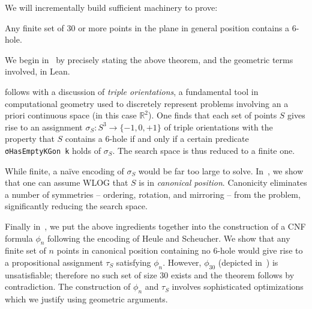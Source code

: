 We will incrementally build sufficient machinery to prove:

\begin{theorem*}
Any finite set of $30$ or more points in the plane in general position contains a $6$-hole.
\end{theorem*}

We begin in~ by precisely stating the above theorem,
and the geometric terms involved, in Lean.

 follows with a discussion of \emph{triple orientations},
a fundamental tool in computational geometry
used to discretely represent problems
involving an a priori continuous space (in this case $\mathbb{R}^2$).
One finds that each set of points $S$ gives rise to an assignment $\sigma_S: S^3 \to \{-1,0,+1\}$
of triple orientations
with the property that $S$ contains a $6$-hole
if and only if a certain predicate \lstinline|σHasEmptyKGon k| holds of $\sigma_S$.
The search space is thus reduced to a finite one.

While finite, a naïve encoding of $\sigma_S$ would be far too large to solve.
In~, we show that one can assume WLOG
that $S$ is in \emph{canonical position}.
Canonicity eliminates a number of symmetries --
ordering, rotation, and mirroring --
from the problem,
significantly reducing the search space.

Finally in~,
we put the above ingredients together
into the construction of a CNF formula $\phi_n$
following the encoding of Heule and Scheucher.
We show that any finite set of $n$ points in canonical position
containing no $6$-hole
would give rise to a propositional assignment $\tau_S$ satisfying $\phi_n$.
However, $\phi_{30}$ (depicted in~) is unsatisfiable;
therefore no such set of size $30$ exists
and the theorem follows by contradiction.
The construction of $\phi_n$ and $\tau_S$
involves sophisticated optimizations
which we justify using geometric arguments.




